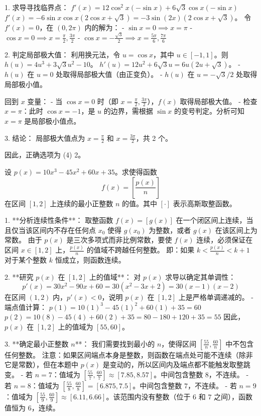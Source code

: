 \begin{questions}
\begin{solution}
1. 求导寻找临界点：
$f'(x) = 12\cos^2 x(-\sin x) + 6\sqrt{3}\cos x(-\sin x)$
$f'(x) = -6\sin x \cos x (2\cos x + \sqrt{3}) = -3\sin(2x)(2\cos x + \sqrt{3})$。
令 $f'(x) = 0$，在 $(0, 2\pi)$ 内的解为：
- $\sin x = 0 \implies x = \pi$
- $\cos x = 0 \implies x = \frac{\pi}{2}, \frac{3\pi}{2}$
- $\cos x = -\frac{\sqrt{3}}{2} \implies x = \frac{5\pi}{6}, \frac{7\pi}{6}$

2. 判定局部极大值：
利用换元法，令 $u = \cos x$，其中 $u \in [-1, 1]$。则 $h(u) = 4u^3 + 3\sqrt{3}u^2 - 10$。
$h'(u) = 12u^2 + 6\sqrt{3}u = 6u(2u + \sqrt{3})$。
- $h(u)$ 在 $u=0$ 处取得局部极大值（由正变负）。
- $h(u)$ 在 $u=-\sqrt{3}/2$ 处取得局部极小值。

回到 $x$ 变量：
- 当 $\cos x = 0$ 时（即 $x = \frac{\pi}{2}, \frac{3\pi}{2}$），$f(x)$ 取得局部极大值。
- 检查 $x = \pi$：此时 $\cos x = -1$，是 $u$ 的边界，需根据 $\sin x$ 的变号判定。分析可知 $x=\pi$ 是局部极小值点。

3. 结论：
局部极大值点为 $x = \frac{\pi}{2}$ 和 $x = \frac{3\pi}{2}$，共 2 个。

因此，正确选项为 (4) 2。
\end{solution}
    \question 
设 $p(x) = 10x^3 - 45x^2 + 60x + 35$。求使得函数
\[
f(x) = \left[ \frac{p(x)}{n} \right]
\]
在区间 $[1, 2]$ 上连续的最小正整数 $n$ 的值。其中 $[ \cdot ]$ 表示高斯取整函数。

\begin{solution}
    1. **分析连续性条件**：
    取整函数 $f(x) = [g(x)]$ 在一个闭区间上连续，当且仅当该区间内不存在任何点 $x_0$ 使得 $g(x_0)$ 为整数，或者 $g(x)$ 在该区间上为常数。
    由于 $p(x)$ 是三次多项式而非比例常数，要使 $f(x)$ 连续，必须保证在区间 $x \in [1, 2]$ 上，$\frac{p(x)}{n}$ 的值域不跨越任何整数。
    即：如果 $k < \frac{p(x)}{n} < k+1$ 对于某个整数 $k$ 恒成立，则函数连续。

    2. **研究 $p(x)$ 在 $[1, 2]$ 上的值域**：
    对 $p(x)$ 求导以确定其单调性：
    \[
    p'(x) = 30x^2 - 90x + 60 = 30(x^2 - 3x + 2) = 30(x-1)(x-2)
    \]
    在区间 $(1, 2)$ 内，$p'(x) < 0$，说明 $p(x)$ 在 $[1, 2]$ 上是严格单调递减的。
    - 端点值计算：
      $p(1) = 10(1)^3 - 45(1)^2 + 60(1) + 35 = 60$
      $p(2) = 10(8) - 45(4) + 60(2) + 35 = 80 - 180 + 120 + 35 = 55$
    因此，$p(x)$ 在 $[1, 2]$ 上的值域为 $[55, 60]$。

    3. **确定最小正整数 $n$**：
    我们需要找到最小的 $n$，使得区间 $\left[ \frac{55}{n}, \frac{60}{n} \right]$ 中不包含任何整数。
    注意：如果区间端点本身是整数，则函数在端点处可能不连续（除非它是常数），但在本题中 $p(x)$ 是变动的，所以区间内及端点都不能触发取整跳变。
    - 若 $n=7$：值域为 $\left[ \frac{55}{7}, \frac{60}{7} \right] \approx [7.85, 8.57]$。中间包含整数 $8$，不连续。
    - 若 $n=8$：值域为 $\left[ \frac{55}{8}, \frac{60}{8} \right] = [6.875, 7.5]$。中间包含整数 $7$，不连续。
    - 若 $n=9$：值域为 $\left[ \frac{55}{9}, \frac{60}{9} \right] \approx [6.11, 6.66]$。该范围内没有整数（位于 $6$ 和 $7$ 之间），函数值恒为 $6$，连续。


\end{solution}
\end{questions}
